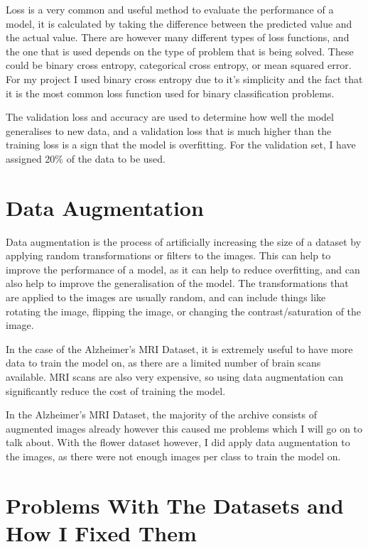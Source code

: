 \documentclass[]{final_report}
\begin{document}
Loss is a very common and useful method to evaluate the performance of a model, it is calculated by taking the difference between the predicted value and the actual value.
There are however many different types of loss functions, and the one that is used depends on the type of problem that is being solved.
These could be binary cross entropy, categorical cross entropy, or mean squared error. For my project I used binary cross entropy due
to it's simplicity and the fact that it is the most common loss function used for binary classification problems.

The validation loss and accuracy are used to determine how well the model generalises to new data, and a validation loss that is much higher than the training loss is a sign that the model is overfitting.
For the validation set, I have assigned 20\% of the data to be used.

\section{Data Augmentation}

Data augmentation is the process of artificially increasing the size of a dataset by applying random transformations or filters to the images.
This can help to improve the performance of a model, as it can help to reduce overfitting, and can also help to improve the generalisation of the model.
The transformations that are applied to the images are usually random, and can include things like rotating the image,
flipping the image, or changing the contrast/saturation of the image.

In the case of the Alzheimer's MRI Dataset, it is extremely useful to have more data to train the model on, as there are a limited number of brain scans available.
MRI scans are also very expensive, so using data augmentation can significantly reduce the cost of training the model.

In the Alzheimer's MRI Dataset, the majority of the archive consists of augmented images already however this caused me problems which I will go on to talk about.
With the flower dataset however, I did apply data augmentation to the images, as there were not enough images per class to train the model on.

\section{Problems With The Datasets and How I Fixed Them}
\end{document}
